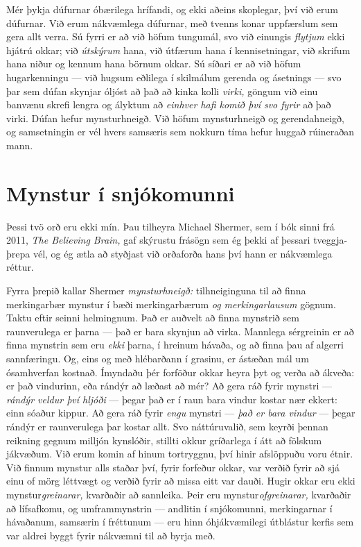Mér þykja dúfurnar óbærilega hrífandi, og ekki aðeins skoplegar, því við erum dúfurnar. Við erum nákvæmlega dúfurnar, með tvenns konar uppfærslum sem gera allt verra. Sú fyrri er að við höfum tungumál, svo við einungis \emph{flytjum} ekki hjátrú okkar; við \emph{útskýrum} hana, við útfærum hana í kennisetningar, við skrifum hana niður og kennum hana börnum okkar. Sú síðari er að við höfum hugarkenningu — við hugsum eðlilega í skilmálum gerenda og ásetnings — svo þar sem dúfan skynjar óljóst að það að kinka kolli \emph{virki,} göngum við einu banvænu skrefi lengra og ályktum að \emph{einhver hafi komið því svo fyrir} að það virki. Dúfan hefur mynsturhneigð. Við höfum mynsturhneigð og gerendahneigð, og samsetningin er vél hvers samsæris sem nokkurn tíma hefur huggað rúineraðan mann.

\section*{Mynstur í snjókomunni}

Þessi tvö orð eru ekki mín. Þau tilheyra Michael Shermer, sem í bók sinni frá 2011, \emph{The Believing Brain,} gaf skýrustu frásögn sem ég þekki af þessari tveggja-þrepa vél, og ég ætla að styðjast við orðaforða hans því hann er nákvæmlega réttur.

Fyrra þrepið kallar Shermer \emph{mynsturhneigð:} tilhneiginguna til að finna merkingarbær mynstur í bæði merkingarbærum \emph{og merkingarlausum} gögnum. Taktu eftir seinni helmingnum. Það er auðvelt að finna mynstrið sem raunverulega er þarna — það er bara skynjun að virka. Mannlega sérgreinin er að finna mynstrin sem eru \emph{ekki} þarna, í hreinum hávaða, og að finna þau af algerri sannfæringu. Og, eins og með hlébarðann í grasinu, er ástæðan mál um ósamhverfan kostnað. Ímyndaðu þér forföður okkar heyra þyt og verða að ákveða: er það vindurinn, eða rándýr að læðast að mér? Að gera ráð fyrir mynstri — \emph{rándýr veldur því hljóði} — þegar það er í raun bara vindur kostar nær ekkert: einn sóaður kippur. Að gera ráð fyrir \emph{engu} mynstri — \emph{það er bara vindur} — þegar rándýr er raunverulega þar kostar allt. Svo náttúruvalið, sem keyrði þennan reikning gegnum milljón kynslóðir, stillti okkur gríðarlega í átt að fölskum jákvæðum. Við erum komin af hinum tortryggnu, því hinir afslöppuðu voru étnir. Við finnum mynstur alls staðar því, fyrir forfeður okkar, var verðið fyrir að sjá einu of mörg léttvægt og verðið fyrir að missa eitt var dauði. Hugir okkar eru ekki mynstur\emph{greinarar,} kvarðaðir að sannleika. Þeir eru mynstur\emph{ofgreinarar,} kvarðaðir að lífsafkomu, og umframmynstrin — andlitin í snjókomunni, merkingarnar í hávaðanum, samsærin í fréttunum — eru hinn óhjákvæmilegi útblástur kerfis sem var aldrei byggt fyrir nákvæmni til að byrja með.

